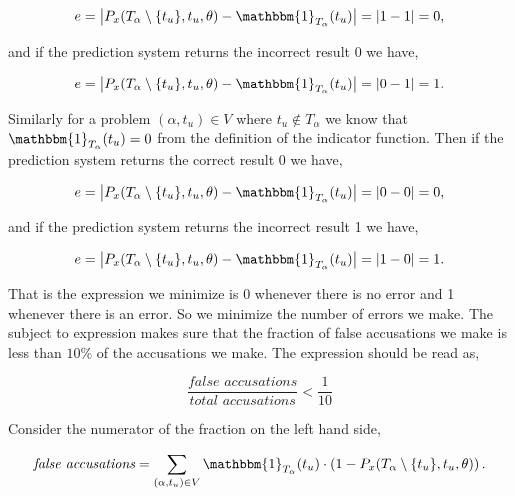 \begin{equation}
    e = \left|
        P_x(T_\alpha \setminus \{t_u\}, t_u, \theta) -
        \mathbbm{1}_{T_\alpha}(t_u)
    \right| = |1 - 1| = 0,
\end{equation}

and if the prediction system returns the incorrect result 0 we have,

\begin{equation}
    e = \left|
        P_x(T_\alpha \setminus \{t_u\}, t_u, \theta) -
        \mathbbm{1}_{T_\alpha}(t_u)
    \right| = |0 - 1| = 1.
\end{equation}

Similarly for a problem $(\alpha, t_u) \in V$ where $t_u \notin T_\alpha$ we
know that $\mathbbm{1}_{T_\alpha}(t_u) = 0$ from the definition of the indicator
function. Then if the prediction system returns the correct result 0 we have,

\begin{equation}
    e = \left|
        P_x(T_\alpha \setminus \{t_u\}, t_u, \theta) -
        \mathbbm{1}_{T_\alpha}(t_u)
    \right| = |0 - 0| = 0, \end{equation}

and if the prediction system returns the incorrect result 1 we have,

\begin{equation}
    e = \left|
        P_x(T_\alpha \setminus \{t_u\}, t_u, \theta) -
        \mathbbm{1}_{T_\alpha}(t_u)
    \right| = |1 - 0| = 1.
\end{equation}

That is the expression we minimize is 0 whenever there is no error and 1
whenever there is an error. So we minimize the number of errors we make. The
subject to expression makes sure that the fraction of false accusations we make
is less than $10\%$ of the accusations we make. The expression should be read
as,

\begin{equation}
    \frac{\textit{false accusations}}{\textit{total accusations}} < \frac{1}{10}
\end{equation}

Consider the numerator of the fraction on the left hand side,

\begin{equation}
    \textit{false accusations} = \sum_{(\alpha, t_u) \in V}
    \mathbbm{1}_{T_\alpha}(t_u) \cdot
    \left(1 - P_x(T_\alpha \setminus \{t_u\}, t_u, \theta)\right).
\end{equation}

